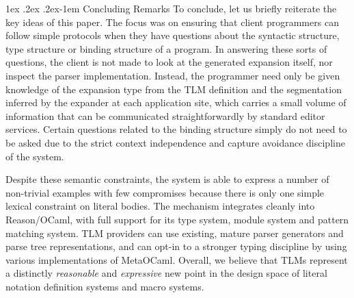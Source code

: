 \documentclass[acmsmall,screen]{acmart}
\makeatletter
\renewcommand{\paragraph}{%
  \@startsection{paragraph}{4}%
  {\z@}{1ex \@plus .2ex \@minus .2ex}{-1em}%
  {\normalfont\normalsize\bfseries}%
}
\makeatother
\begin{document}




\paragraph{Concluding Remarks} 
To conclude, let us briefly reiterate the key ideas of this paper. The focus was on ensuring that client programmers can follow simple protocols when they have questions about the syntactic structure, type structure or binding structure of a program. In answering these sorts of questions,  the client is not made to look at the generated expansion itself, nor inspect the parser implementation. Instead, the programmer need only be given knowledge of the expansion type from the TLM definition and the segmentation inferred by the expander at each application site, which carries a small volume of information that can be communicated straightforwardly by standard editor services. Certain questions related to the binding structure simply do not need to be asked due to the strict context independence and capture avoidance discipline of the system.%

Despite these semantic constraints, the system is able to express a number of non-trivial examples with few compromises because there is only one simple lexical constraint on literal bodies. The mechanism integrates cleanly into Reason/OCaml, with full support for its type system, module system and pattern matching system. TLM providers can use existing, mature parser generators and parse tree representations, and can opt-in to a stronger typing discipline by using various implementations of MetaOCaml. Overall, we believe that TLMs represent a distinctly \emph{reasonable} and \emph{expressive} new point in the design space of literal notation definition systems and macro systems.
\vspace{-5px}
\end{document}
